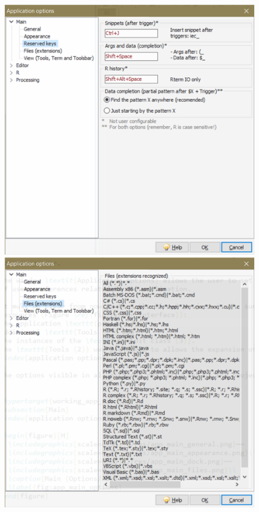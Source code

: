 \begin{figure}[H]
  \includegraphics[scale=0.45]{./res/app_main_reservedkeys.png}\\
  \includegraphics[scale=0.45]{./res/app_main_files.png}~~

\end{figure}
